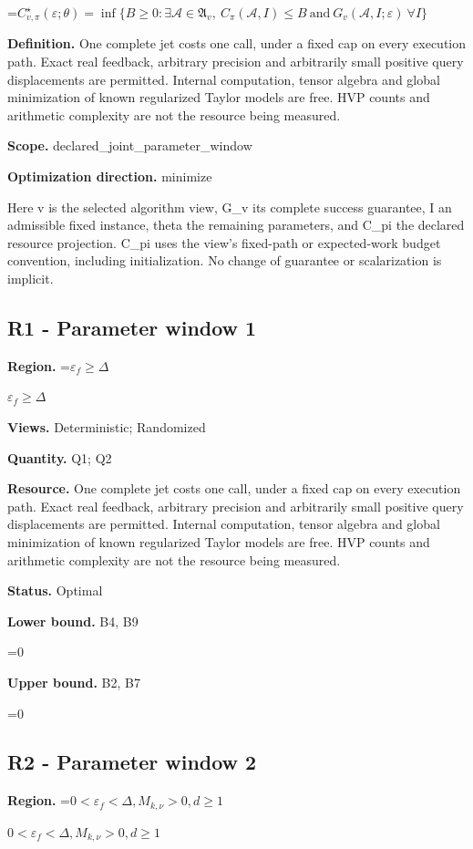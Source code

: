 \documentclass[10pt,a4paper]{article}
\newcommand{\AtlasMath}[1]{\par\begingroup\centering\setbox0=\hbox{$\displaystyle #1$}\ifdim\wd0>1.4\linewidth\typeout{ATLAS WIDE FORMULA: \the\wd0}\fi\ifdim\wd0>\linewidth\resizebox{\linewidth}{!}{\box0}\else\box0\fi\par\endgroup}
\newcommand{\AtlasInlineMath}[1]{\begingroup\setbox0=\hbox{$#1$}\ifdim\wd0>.4\linewidth\endgroup\AtlasMath{#1}\else\endgroup$#1$\fi}
\begin{document}
\AtlasMath{C^\star_{v,\pi}(\varepsilon;\theta)=\inf\{B\ge0:\exists\mathcal A\in\mathfrak A_v,\ C_\pi(\mathcal A,I)\le B\ \text{and}\ G_v(\mathcal A,I;\varepsilon)\ \forall I\}}
\textbf{Definition.} One complete jet costs one call, under a fixed cap on every execution path. Exact real feedback, arbitrary precision and arbitrarily small positive query displacements are permitted. Internal computation, tensor algebra and global minimization of known regularized Taylor models are free. HVP counts and arithmetic complexity are not the resource being measured.

\textbf{Scope.} declared\_joint\_parameter\_window

\textbf{Optimization direction.} minimize

Here v is the selected algorithm view, G\_v its complete success guarantee, I an admissible fixed instance, theta the remaining parameters, and C\_pi the declared resource projection. C\_pi uses the view's fixed-path or expected-work budget convention, including initialization. No change of guarantee or scalarization is implicit.

\subsection{R1 - Parameter window 1}
\textbf{Region.} \AtlasInlineMath{\varepsilon_f\ge \Delta}

\textbf{Views.} Deterministic; Randomized

\textbf{Quantity.} Q1; Q2

\textbf{Resource.} One complete jet costs one call, under a fixed cap on every execution path. Exact real feedback, arbitrary precision and arbitrarily small positive query displacements are permitted. Internal computation, tensor algebra and global minimization of known regularized Taylor models are free. HVP counts and arithmetic complexity are not the resource being measured.

\textbf{Status.} Optimal

\textbf{Lower bound.} B4, B9

\AtlasMath{0}
\textbf{Upper bound.} B2, B7

\AtlasMath{0}
\subsection{R2 - Parameter window 2}
\textbf{Region.} \AtlasInlineMath{0<\varepsilon_f<\Delta,M_{k,\nu}>0,d\ge 1}
\end{document}
